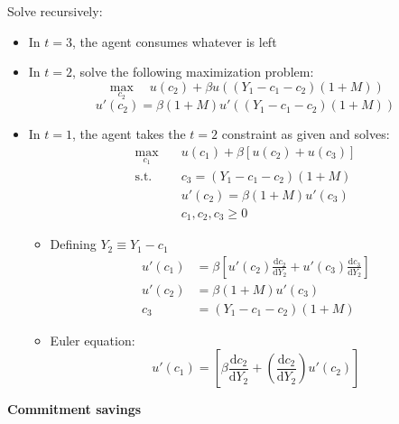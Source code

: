 \documentclass[a4paper]{article}
\begin{document}
Solve recursively:
\begin{itemize}
    \item In $t=3$, the agent consumes whatever is left
    \item In $t=2$, solve the following maximization problem:
    \[\max_{c_2}\quad u(c_2)+\beta u\left((Y_1-c_1-c_2)(1+M)\right) \]
    \[u'(c_2)=\beta(1+M)u'\left((Y_1-c_1-c_2)(1+M)\right) \]
    \item In $t=1$, the agent takes the $t=2$ constraint as given and solves:
    \begin{align*}
        \max_{c_1}\quad & u(c_1)+\beta[u(c_2)+u(c_3) ] \\
        \textrm{s.t.}\quad & c_3=(Y_1-c_1-c_2)(1+M) \\
        & u'(c_2)=\beta(1+M)u'(c_3) \\
        & c_1, c_2, c_3 \geq 0
    \end{align*}
    \begin{itemize}
        \item Defining $Y_2\equiv Y_1-c_1$
        \begin{align*}
            u'(c_1)&=\beta\left[u'(c_2)\frac{\textrm{d}c_2}{\textrm{d}Y_2}+
            u'(c_3)\frac{\textrm{d}c_3}{\textrm{d}Y_2} \right] \\
            u'(c_2)&=\beta(1+M)u'(c_3) \\
            c_3&=(Y_1-c_1-c_2)(1+M)
        \end{align*}
        \item Euler equation:
        \[u'(c_1)=\left[\beta\frac{\textrm{d}c_2}{\textrm{d}Y_2}+
        \left(\frac{\textrm{d}c_2}{\textrm{d}Y_2}\right)u'(c_2) \right] \]
    \end{itemize}
\end{itemize}

\textbf{Commitment savings}
\end{document}

